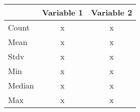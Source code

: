 \begin{tabular}{lcc}
\toprule
& Variable 1 & Variable 2 \\
\midrule
Count & x & x \\
Mean & x & x \\
Stdv &x  &  x\\
Min &x  & x \\
Median &  x& x\\
Max & x&  x\\
\bottomrule
\end{tabular}